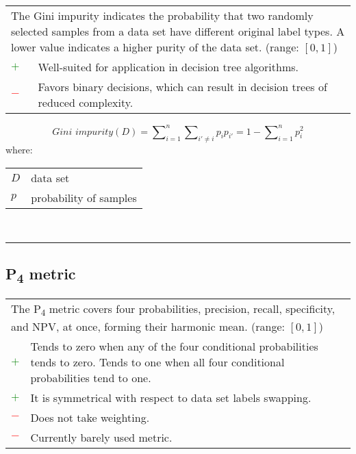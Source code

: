 \documentclass{article}
\makeatletter
\newenvironment{conditions}[1][where:]
	{\hspace{0.02\textwidth} #1 \begin{tabular}[t]{>{$}l<{$} @{${}={}$} l}}
	{\end{tabular}\\[\belowdisplayskip]}
\makeatother
\begin{document}
\begin{table}[H]\centering
	\begin{tabular}{m{}m{}}
		\multicolumn{2}{m{0.95\textwidth}}{The Gini impurity indicates the probability that two randomly selected samples from a data set have different original label types. A lower value indicates a higher purity of the data set. (range: $[0, 1]$)} \\
		\textcolor{Green}{$+$} & Well-suited for application in decision tree algorithms. \\
		\textcolor{Red}{$-$}   & Favors binary decisions, which can result in decision trees of reduced complexity.
	\end{tabular}
\end{table}

\begin{equation}
	\textit{Gini impurity}(D) = \sum\nolimits_{i = 1}^n \sum\nolimits_{i' \not= i} p_i p_{i'} = 1 - \sum\nolimits_{i = 1}^n p^2_i
%
	\label{equation:Gini_impurity}
\end{equation}
%
\begin{conditions}
	D & data set \\
	p & probability of samples
\end{conditions}

\hrule


\subsection[P4 metric]{P\textsubscript{4} metric \cite{sitarz2023extending}}

\begin{table}[H]\centering
	\begin{tabular}{m{}m{}}
		\multicolumn{2}{m{0.95\textwidth}}{The P\textsubscript{4} metric covers four probabilities, precision, recall, specificity, and NPV, at once, forming their harmonic mean. (range: $[0, 1]$)} \\
		\textcolor{Green}{$+$} & Tends to zero when any of the four conditional probabilities tends to zero. Tends to one when all four conditional probabilities tend to one. \\
		\textcolor{Green}{$+$} & It is symmetrical with respect to data set labels swapping. \\
		\textcolor{Red}{$-$}   & Does not take weighting. \\
		\textcolor{Red}{$-$}   & Currently barely used metric.
	\end{tabular}
\end{table}
\end{document}

